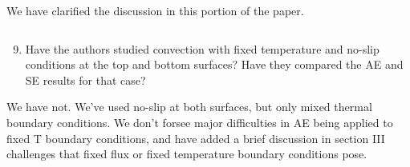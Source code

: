 \documentclass[aps, 11pt, singlecolumn]{revtex4-1} %
\begin{document}
\begin{singlespace}
We have clarified the discussion in this portion of the paper.

\begin{myquotation}
$\,$\\\vspace{-1.25cm}
\begin{enumerate}
\setcounter{enumi}{8}
\item Have the authors studied convection with fixed temperature and no-slip conditions at the top and bottom surfaces? Have they compared the AE and SE results for that case?
\end{enumerate}
\end{myquotation}
We have not. We've used no-slip at both surfaces, 
but only mixed thermal boundary conditions. 
We don't forsee major difficulties in AE being applied to fixed T boundary 
conditions, and have added a brief discussion in section III challenges that
fixed flux or fixed temperature boundary conditions pose.





\end{singlespace}





\end{document}
